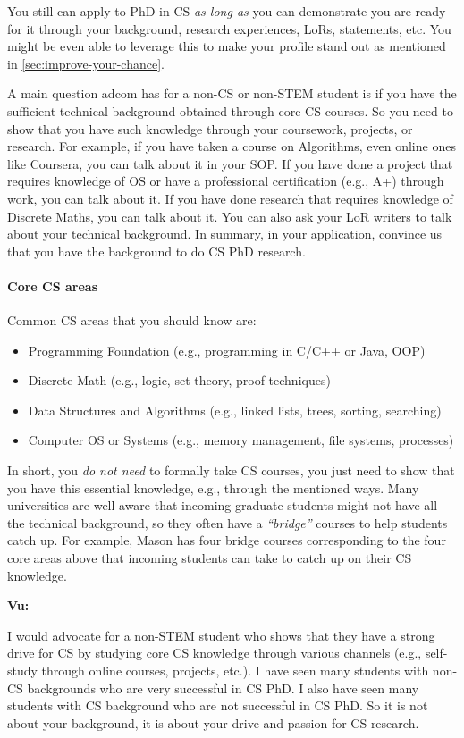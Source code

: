 \documentclass[oneside,11pt,dvipsnames]{book}
\newenvironment{commentbox}[1][]{
  \small
  \begin{mybox}
    {\small \textbf{#1}}
  }{
  \end{mybox}
}
\begin{document}
You still can apply to PhD in CS \emph{as long as} you can demonstrate you are ready for it through your background, research experiences, LoRs, statements, etc. You might be even able to leverage this to make your profile stand out as mentioned in \autoref{sec:improve-your-chance}.

A main question adcom has for a non-CS or non-STEM student is if you have the sufficient technical background obtained through core CS courses.  So you need to show that you have such knowledge through your coursework, projects, or research.
For example, if you have taken a course on Algorithms, even online ones like Coursera, you can talk about it in your SOP.  If you have done a project that requires knowledge of OS or have a professional certification (e.g., A+) through work, you can talk about it.  If you have done research that requires knowledge of Discrete Maths, you can talk about it.  You can also ask your LoR writers to talk about your technical background.
In summary, in your application, convince us that you have the background to do CS PhD research.


\paragraph{Core CS areas} Common CS areas that you should know are:
\begin{itemize}
  \item Programming Foundation (e.g., programming in C/C++ or Java, OOP)
  \item Discrete Math (e.g., logic, set theory, proof techniques)
  \item Data Structures and Algorithms (e.g., linked lists, trees, sorting, searching)
  \item Computer OS or Systems (e.g., memory management, file systems, processes)
\end{itemize}

In short, you \emph{do not need} to formally take CS courses, you just need to show that you have this essential knowledge, e.g., through the mentioned ways. Many universities are well aware that incoming graduate students might not have all the technical background, so they often have a \emph{``bridge''} courses to help students catch up.  For example, Mason has four bridge courses corresponding to the four core areas above that incoming students can take to catch up on their CS knowledge.


\begin{commentbox}[Vu:]
  I would advocate for a non-STEM student who shows that they have a strong drive for CS by studying core CS knowledge through various channels (e.g., self-study through online courses, projects, etc.).  I have seen many students with non-CS backgrounds who are very successful in CS PhD.  I also have seen many students with CS background who are not successful in CS PhD.  So it is not about your background, it is about your drive and passion for CS research.
\end{commentbox}
\end{document}
